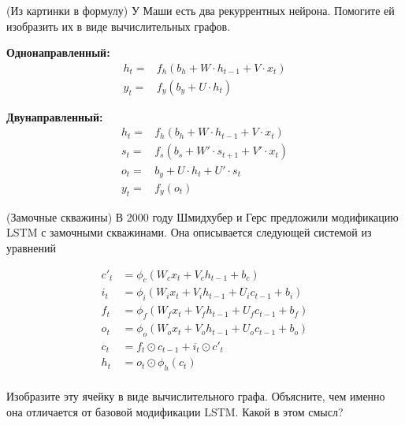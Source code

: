 \begin{problem}{(Из картинки в формулу)}
    У Маши есть два рекуррентных нейрона. Помогите ей изобразить их в виде вычислительных графов.
    
    \begin{minipage}{0.45\linewidth} 
    \textbf{Однонаправленный:}
    	\begin{equation*} 
        	\begin{aligned}
        	h_t =& f_h(b_h + W \cdot h_{t-1} + V \cdot x_t)\\
        	y_t =& f_y(b_y + U \cdot h_t)
        	\end{aligned}
    	\end{equation*} 
    \end{minipage}
    \hfill
    \begin{minipage}{0.45\linewidth} 
    \textbf{Двунаправленный:}
    	\begin{equation*} 
        	\begin{aligned}
        	h_t =& f_h(b_h + W \cdot h_{t-1} + V \cdot x_t)\\
        	s_t =& f_s(b_s + W' \cdot s_{t+1} + V' \cdot x_t)\\
        	o_t =& b_y + U \cdot h_t + U' \cdot s_t \\
        	y_t =& f_y(o_t)
        	\end{aligned}
    	\end{equation*} 
    \end{minipage}
    
\end{problem}

\begin{problem}{(Замочные скважины)}
В 2000 году Шмидхубер и Герс предложили модификацию LSTM с замочными скважинами. Она описывается следующей системой из уравнений 

\begin{equation*} 
	\begin{aligned}
	c'_t &= \phi_c(W_c x_t + V_c h_{t-1} + b_c) \\
	i_t &= \phi_i(W_i x_t + V_i h_{t-1} + U_i c_{t-1} + b_i) \\
	f_t &= \phi_f(W_f x_t + V_f h_{t-1} + U_f c_{t-1} + b_f) \\
    o_t &= \phi_o(W_o x_t + V_o h_{t-1} + U_o c_{t-1} + b_o) \\
    c_t &= f_t \odot c_{t-1} + i_t \odot c'_t \\
    h_t &= o_t \odot \phi_h(c_t) \\
	\end{aligned}
\end{equation*} 

Изобразите эту ячейку в виде вычислительного графа. Объясните, чем именно она отличается от базовой модификации LSTM. Какой в этом смысл?
\end{problem}


